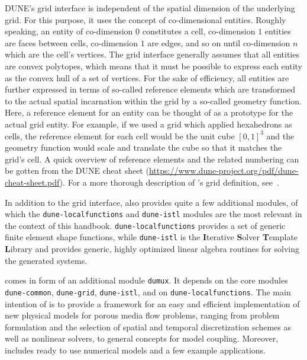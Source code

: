 DUNE's grid interface is independent of the spatial dimension of the
underlying grid. For this purpose, it uses the concept of
co-dimensional entities. Roughly speaking, an entity of co-dimension
$0$ constitutes a cell, co-dimension $1$ entities are faces between
cells, co-dimension $1$ are edges, and so on until co-dimension $n$
which are the cell's vertices.  The \Dune grid interface generally
assumes that all entities are convex polytopes, which means that it
must be possible to express each entity as the convex hull of a set of
vertices. For the sake of efficiency, all entities are further expressed in terms
of so-called reference elements which are transformed to the actual
spatial incarnation within the grid by a so-called geometry
function. Here, a reference element for an
entity can be thought of as a prototype for the actual grid
entity. For example, if we used a grid which applied hexahedrons as cells,
the reference element for each cell would be the unit cube $[0, 1]^3$
and the geometry function would scale and translate the cube so that
it matches the grid's cell. A quick overview of reference elements and the
related numbering can be gotten from the DUNE cheat sheet
(\url{https://www.dune-project.org/pdf/dune-cheat-sheet.pdf}).
For a more thorough description of \Dune's
grid definition, see~\cite{BASTIAN2008}.

In addition to the grid interface, \Dune also provides quite a few
additional modules, of which the \texttt{dune-localfunctions} and
\texttt{dune-istl} modules are the most relevant in the context of
this handbook. \texttt{dune-localfunctions} provides a set of generic
finite element shape functions, while \texttt{dune-istl} is the
\textbf{I}terative \textbf{S}olver \textbf{T}emplate \textbf{L}ibrary
and provides generic, highly optimized linear algebra routines for
solving the generated systems.

\Dumux comes in form of an additional module \texttt{dumux}.
It depends on the \Dune core modules
\texttt{dune-common}, \texttt{dune-grid}, \texttt{dune-istl}, and on \texttt{dune-localfunctions}.
The main intention of \Dumux is to provide a framework for an easy and efficient
implementation of new physical models for porous media flow problems,
ranging from problem formulation and the selection of
spatial and temporal discretization schemes as well as nonlinear solvers,
to general concepts for model coupling.
Moreover, \Dumux includes ready to use numerical models and a few example applications.

